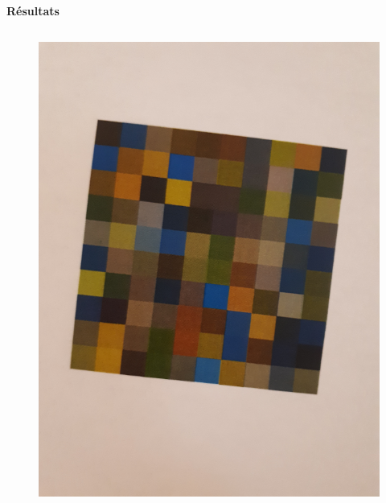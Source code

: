\documentclass{beamer}
\begin{document}
\begin{frame}[t]
\begin{columns}[t]
\begin{column}{.5\linewidth}
\begin{block}{\centering \textbf{Résultats}}
                    \begin{columns}[t]
                        \begin{column}{.2\linewidth}
                            \begin{figure}[t]
                                \includegraphics[width=\linewidth]{rsc/van_gogh_picture_a_10.png}\\
                            \end{figure}
                        \end{column}


\end{columns}
\end{block}
\end{column}
\end{columns}
\end{frame}
\end{document}
